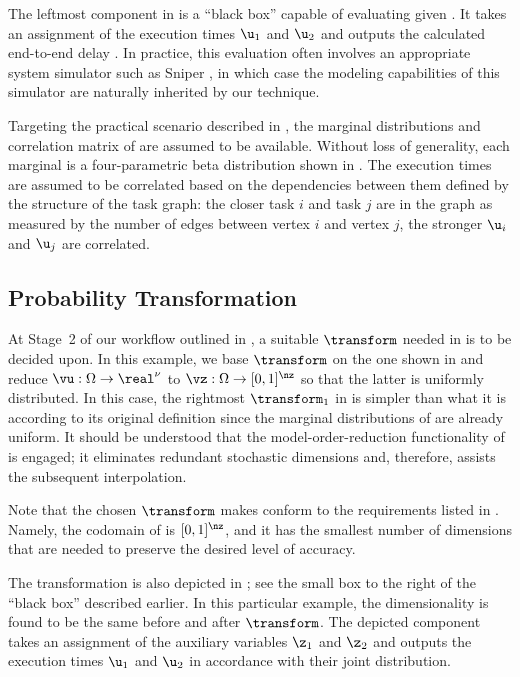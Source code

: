 The leftmost component in  is a ``black box'' capable of
evaluating \g given \vu. It takes an assignment of the execution times $\u_1$
and $\u_2$ and outputs the calculated end-to-end delay \g. In practice, this
evaluation often involves an appropriate system simulator such as Sniper
\cite{carlson2011}, in which case the modeling capabilities of this simulator
are naturally inherited by our technique.

Targeting the practical scenario described in , the
marginal distributions and correlation matrix of \vu are assumed to be
available. Without loss of generality, each marginal is a four-parametric beta
distribution shown in . The execution times are assumed
to be correlated based on the dependencies between them defined by the structure
of the task graph: the closer task $i$ and task $j$ are in the graph as measured
by the number of edges between vertex $i$ and vertex $j$, the stronger $\u_i$
and $\u_j$ are correlated.

\subsection{Probability Transformation}

At Stage~2 of our workflow outlined in , a suitable
$\transform$ needed in  is to be decided upon. In
this example, we base $\transform$ on the one shown in
 and reduce $\vu: \Omega \to \real^\nu$ to
$\vz: \Omega \to [0, 1]^\nz$ so that the latter is uniformly distributed. In
this case, the rightmost $\transform_1$ in  is
simpler than what it is according to its original definition since the marginal
distributions of \vz are already uniform. It should be understood that the
model-order-reduction functionality of  is
engaged; it eliminates redundant stochastic dimensions and, therefore, assists
the subsequent interpolation.

Note that the chosen $\transform$ makes \vz conform to the requirements listed
in . Namely, the codomain of \vz is $[0, 1]^\nz$, and
it has the smallest number of dimensions that are needed to preserve the desired
level of accuracy.

The transformation is also depicted in ; see the small
box to the right of the ``black box'' described earlier. In this particular
example, the dimensionality is found to be the same before and after
$\transform$. The depicted component takes an assignment of the auxiliary
variables $\z_1$ and $\z_2$ and outputs the execution times $\u_1$ and $\u_2$ in
accordance with their joint distribution.

